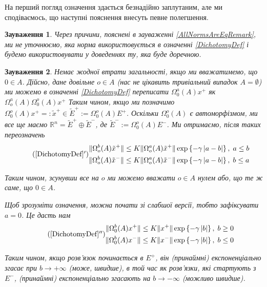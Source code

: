 \documentclass[14pt]{extarticle} %
\newtheorem{remark}{Зауваження}
\begin{document}
На перший погляд означення здається безнадійно заплутаним, але ми сподіваємось, що наступні пояснення внесуть певне полегшення.
\begin{remark}
	Через причини, пояснені в зауваженні \ref{AllNormsAreEqRemark}, ми не уточнюємо, яка норма використовується в означенні
	\ref{DichotomyDef} і будемо використовувати у доведеннях ту, яка буде доречною.
\end{remark}
\begin{remark}
Немає жодної втрати загальності, якщо ми вважатимемо, що $0\in A$. Дійсно, дане довільне $o\in A$ (нас не цікавить тривіальний
випадок $A=\emptyset$) ми можемо в означенні \ref{DichotomyDef} переписати $\Omega_0^a(A)x^+$ як $\Omega_o^a(A)\Omega_0^o(A)x^+$
Таким чином, якщо ми позначимо $\Omega_0^o(A)x^+=:\tilde{x}^+\in \tilde{E}^+:=\Omega_0^o(A)E^+$. Оскільки $\Omega_0^o(A)$ є автоморфізмом,
ми все ще маємо $\mathbb{R}^n=\tilde{E}^+\oplus \tilde{E}^-$, де $\tilde{E}^-:=\Omega_0^o(A)E^-$. Ми отримаємо, після таких переозначень
\begin{equation*}
	\tag{\ref*{DichotomyDef}$'$}
	\begin{aligned}
	\mynorm{\Omega^b_o(A)\tilde{x}^+}\leq K\mynorm{\Omega_o^a(A)\tilde{x}^+}\exp\left\{-\gamma\myabs{a-b}\right\},\;a\leq b\\
	\mynorm{\Omega^b_o(A)\tilde{x}^-}\leq K\mynorm{\Omega_o^a(A)\tilde{x}^-}\exp\left\{-\gamma\myabs{a-b}\right\},\;b\leq a\\
\end{aligned}\end{equation*}

Таким чином, зсунувши все на $o$ ми можемо вважати $o\in A$ нулем або, що те ж саме, що $0\in A$.

Щоб зрозуміти означення, можна почати зі слабшої версії, тобто зафіксувати $a=0$. Це дасть нам
\begin{equation*}
	\tag{\ref*{DichotomyDef}$''$}
	\begin{aligned}
	\mynorm{\Omega^b_0(A){x}^+}\leq K\mynorm{{x}^+}\exp\left\{-\gamma\myabs{b}\right\},\; b\geq 0\\
	\mynorm{\Omega^b_0(A){x}^-}\leq K\mynorm{{x}^-}\exp\left\{-\gamma\myabs{b}\right\},\;b\leq 0\\
\end{aligned}\end{equation*}

Таким чином, якщо розв’язок починається в $E^+$, він (принаймні)
експоненціально
згасає при $b\to+\infty$ (може, швидше), в той час як розв’язки, які стартують з $E^-$,
(принаймні) експоненціально згасають на $b\to-\infty$ (можливо швидше).


\end{remark}
\end{document}
